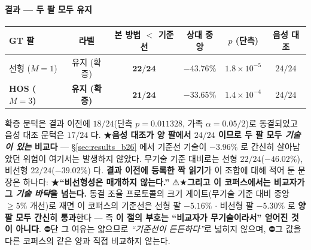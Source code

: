 \documentclass[11pt]{report}
\numberwithin{equation}{chapter}
\numberwithin{figure}{chapter}
\numberwithin{table}{chapter}
\begin{document}
\paragraph{결과 --- 두 팔 모두 유지}
\begin{center}
\small
\begin{tabular}{lccccc}
\toprule
GT 팔 & 라벨 & 본 방법 $<$ 기준선 & 상대 중앙 & $p$ (단측) & 음성 대조 \\
\midrule
선형 ($M{=}1$)        & 유지 (확증) & $\mathbf{22/24}$ & $\mathbf{-43.76\%}$ & $1.8\times10^{-5}$ & $24/24$ \\
\textbf{HOS ($M{=}3$)} & \textbf{유지 (확증)} & $\mathbf{21/24}$ & $\mathbf{-33.65\%}$ & $1.4\times10^{-4}$ & $24/24$ \\
\bottomrule
\end{tabular}
\end{center}
\noindent
확증 문턱은 결과 이전에 $18/24$(단측 $p = 0.011328$, 가족 $\alpha = 0.05/2$)로 동결되었고
음성 대조 문턱은 $17/24$ 다. ★\textbf{음성 대조가 양 팔에서 $24/24$ 이므로 두 팔 모두
\emph{기술이 있는} 비교다} --- \S\ref{sec:results_b26} 에서 기준선 기술이 $-3.96\%$ 로 간신히
살아남았던 위험이 여기서는 발생하지 않았다. 무기술 기준 대비로는 선형 $22/24$($-46.02\%$),
비선형 $22/24$($-39.02\%$) 다. \textbf{결과 이전에 등록한 짝 읽기}가 이 조합에 대해 적어 둔
문장은 하나다: ★\textbf{``비선형성은 매개하지 않는다.''}
⚠★\textbf{그리고 이 코퍼스에서는 비교자가 그 \emph{기술 바닥}을 넘는다.} 동결 조율
프로토콜의 크기 게이트(무기술 기준 대비 중앙 $\geq 5\%$ 개선)로 재면 이 코퍼스의 기준선은
선형 팔 $\mathbf{-5.16\%}$ $\cdot$ 비선형 팔 $\mathbf{-5.30\%}$ 로 \textbf{양 팔 모두
간신히 통과}한다 --- 즉 \textbf{이 절의 부호는 ``비교자가 무기술이라서'' 얻어진 것이
아니다}. ⛔단 그 여유는 얇으므로 \emph{``기준선이 튼튼하다''}로 넓히지 않으며,
⛔그 값을 다른 코퍼스의 같은 양과 직접 비교하지 않는다.
\end{document}
